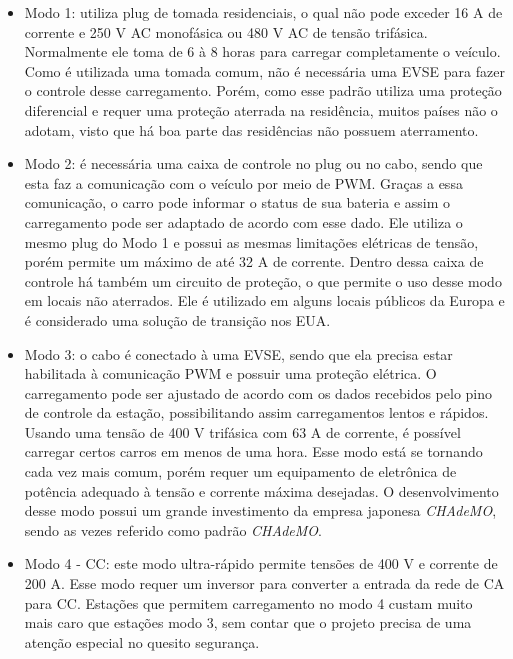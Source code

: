         \begin{itemize}
          \item Modo 1: utiliza plug de tomada residenciais, o qual não pode exceder 16 A de corrente e 250 V \ac{AC} monofásica ou 480 V AC de tensão trifásica. Normalmente ele toma de 6 à 8 horas para carregar completamente o veículo. Como é utilizada uma tomada comum, não é necessária uma \ac{EVSE} para fazer o controle desse carregamento. Porém, como esse padrão utiliza uma proteção diferencial e requer uma proteção aterrada na residência, muitos países não o adotam, visto que há boa parte das residências não possuem aterramento.

          \item Modo 2: é necessária uma caixa de controle no plug ou no cabo, sendo que esta faz a comunicação com o veículo por meio de \ac{PWM}. Graças a essa comunicação, o carro pode informar o status de sua bateria e assim o carregamento pode ser adaptado de acordo com esse dado. Ele utiliza o mesmo plug do Modo 1 e possui as mesmas limitações elétricas de tensão, porém permite um máximo de até 32 A de corrente. Dentro dessa caixa de controle há também um circuito de proteção, o que permite o uso desse modo em locais não aterrados. Ele é utilizado em alguns locais públicos da Europa e é considerado uma solução de transição nos EUA.

          \item Modo 3: o cabo é conectado à uma \ac{EVSE}, sendo que ela precisa estar habilitada à comunicação PWM e possuir uma proteção elétrica. O carregamento pode ser ajustado de acordo com os dados recebidos pelo pino de controle da estação, possibilitando assim carregamentos lentos e rápidos. Usando uma tensão de 400 V trifásica com 63 A de corrente, é possível carregar certos carros em menos de uma hora. Esse modo está se tornando cada vez mais comum, porém requer um equipamento de eletrônica de potência adequado à tensão e corrente máxima desejadas. O desenvolvimento desse modo possui um grande investimento da empresa japonesa \textit{CHAdeMO}, sendo as vezes referido como padrão \textit{CHAdeMO}.

          \item Modo 4 - \ac{CC}: este modo ultra-rápido permite tensões de 400 V e corrente de 200 A. Esse modo requer um inversor para converter a entrada da rede de CA para CC. Estações que permitem carregamento no modo 4 custam muito mais caro que estações modo 3, sem contar que o projeto precisa de uma atenção especial no quesito segurança.
        \end{itemize}

